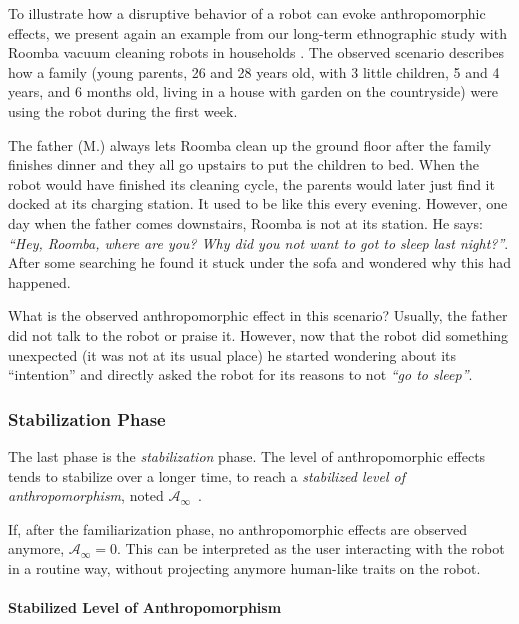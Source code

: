 \documentclass{frontiersSCNS} %
\newcommand{\SLA}{{$\mathcal{A}_\infty$~}}
\newcommand{\sla}{{\mathcal{A}_\infty}}
\begin{document}
To illustrate how a disruptive behavior of a robot can evoke anthropomorphic effects, we present again an example from our long-term ethnographic study with Roomba vacuum cleaning robots in households \citep{fink_living_2013}. The observed scenario describes how a family (young parents, 26 and 28 years old, with 3 little children, 5 and 4 years, and 6 months old, living in a house with garden on the countryside) were using the robot during the first week.

The father (M.) always lets Roomba clean up the ground floor after the family finishes dinner and they all go upstairs to put the children to bed. When the robot would have finished its cleaning cycle, the parents would later just find it docked at its charging station. It used to be like this every evening. However, one day when the father comes downstairs, Roomba is not at its station. He says: \emph{``Hey, Roomba, where are you? Why did you not want to got to sleep last night?''}. After some searching he found it stuck under the sofa and wondered why this had happened. 

What is the observed anthropomorphic effect in this scenario? Usually, the father did not talk to the robot or praise it. However, now that the robot did something unexpected (it was not at its usual place) he started wondering about its ``intention'' and directly asked the robot for its reasons to not \textit{``go to sleep''}. 


\subsubsection{Stabilization Phase\\}
\label{sec:stabilization}

The last phase is the \emph{stabilization} phase. The level of anthropomorphic
effects tends to stabilize over a longer time, to reach a \emph{stabilized
level of anthropomorphism}, noted \SLA.

If, after the familiarization phase, no anthropomorphic effects are observed
anymore, $\sla = 0$. This can be interpreted as the user interacting with the
robot in a routine way, without projecting anymore human-like traits on the
robot.


\paragraph{Stabilized Level of Anthropomorphism\\}
\end{document}
